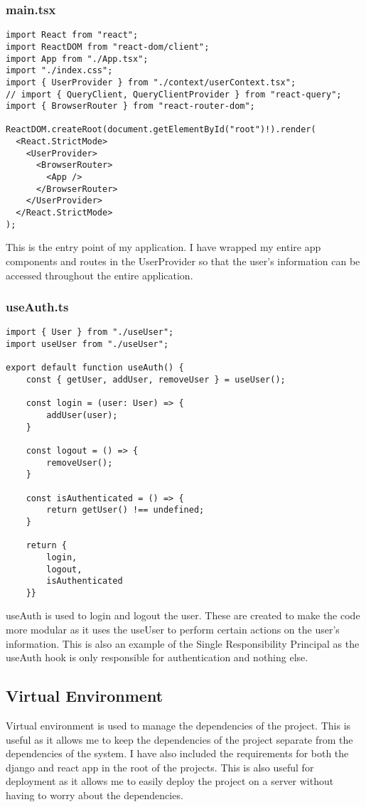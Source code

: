 \subsubsection{main.tsx}
\begin{verbatim}
import React from "react";
import ReactDOM from "react-dom/client";
import App from "./App.tsx";
import "./index.css";
import { UserProvider } from "./context/userContext.tsx";
// import { QueryClient, QueryClientProvider } from "react-query";
import { BrowserRouter } from "react-router-dom";

ReactDOM.createRoot(document.getElementById("root")!).render(
  <React.StrictMode>
    <UserProvider>
      <BrowserRouter>
        <App />
      </BrowserRouter>
    </UserProvider>
  </React.StrictMode>
);
\end{verbatim}
This is the entry point of my application. I have wrapped my entire app components and routes in the UserProvider so that the user's information can be accessed throughout the entire application.

\subsubsection{useAuth.ts}
\begin{verbatim}
import { User } from "./useUser";
import useUser from "./useUser";

export default function useAuth() {
    const { getUser, addUser, removeUser } = useUser();

    const login = (user: User) => {
        addUser(user);
    }

    const logout = () => {
        removeUser();
    }

    const isAuthenticated = () => {
        return getUser() !== undefined;
    }

    return {
        login,
        logout,
        isAuthenticated
    }}
\end{verbatim}
useAuth is used to login and logout the user. These are created to make the code more modular as it uses the useUser to perform certain actions on the user's information. This is also an example of the Single Responsibility Principal as the useAuth hook is only responsible for authentication and nothing else.






\subsection{Virtual Environment}
Virtual environment is used to manage the dependencies of the project. This is useful as it allows me to keep the dependencies of the project separate from the dependencies of the system. I have also included the requirements for both the django and react app in the root of the projects. This is also useful for deployment as it allows me to easily deploy the project on a server without having to worry about the dependencies.

